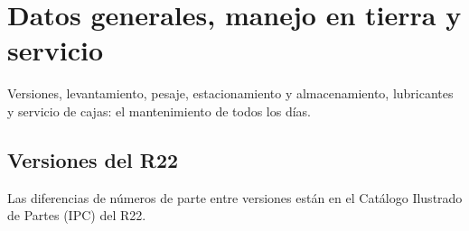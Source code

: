 \chapter{Datos generales, manejo en tierra y servicio}
\label{cap:mm-datos-servicio}

\opening{Versiones, levantamiento, pesaje, estacionamiento y almacenamiento, lubricantes y servicio de cajas: el mantenimiento de todos los días.}

\section{Versiones del R22}

\begin{advertencia}
Las diferencias de números de parte entre versiones están en el Catálogo Ilustrado de Partes (IPC) del R22.
\end{advertencia}

